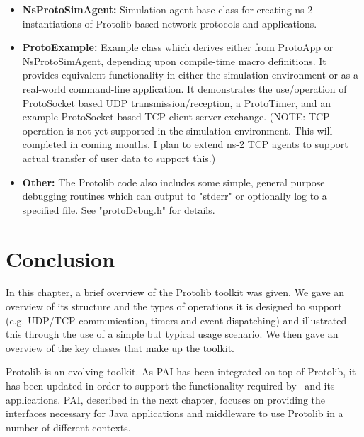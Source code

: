 \begin{itemize}
\item \textbf{NsProtoSimAgent:} Simulation agent base class for creating ns-2
                 instantiations of Protolib-based network
                 protocols and applications.
\item \textbf{ProtoExample:}    Example class which derives either from
                 ProtoApp or NsProtoSimAgent, depending upon
                 compile-time macro definitions.  It provides
                 equivalent functionality in either the
                 simulation environment or as a real-world
                 command-line application.  It demonstrates the
                 use/operation of ProtoSocket based UDP
                 transmission/reception, a ProtoTimer, and an
                 example ProtoSocket-based TCP client-server
                 exchange.   (NOTE: TCP operation is not yet
                 supported in the simulation environment.  This
                 will completed in coming months.  I plan to
                 extend ns-2 TCP agents to support actual
                 transfer of user data to support this.)
\item \textbf{Other:} The Protolib code also includes some simple, general purpose debugging routines which can output to "stderr" or optionally log to a specified file. 
See "protoDebug.h" for details. 

\end{itemize}

\section{Conclusion}


In this chapter, a brief overview of the Protolib toolkit was given.  We gave an overview of its structure and the types of operations it is designed to support (e.g. UDP/TCP communication, timers and event dispatching) and illustrated this through the use of a simple but typical usage scenario. We then gave an overview of the key classes that make up the toolkit. 

Protolib is an evolving toolkit.  As PAI has been integrated on top of Protolib, it has been updated in order to support the functionality required by \agentj~and its applications. PAI, described in the next chapter, focuses on providing the interfaces necessary for Java applications and middleware to use Protolib in a number of different contexts.

